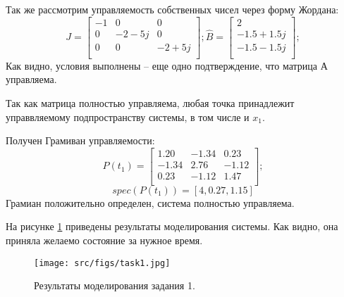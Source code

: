 Так же рассмотрим управляемость собственных чисел через форму Жордана:
\[
        J = \begin{bmatrix}
                -1 & 0 & 0 \\
                0 & -2 - 5j & 0 \\
                0 & 0 & -2 + 5j \\
                \end{bmatrix};
        \hat{B} = \begin{bmatrix}
                2 \\
                -1.5 + 1.5j \\
                -1.5 - 1.5j \\
                \end{bmatrix};
\]
Как видно, условия выполнены -- еще одно подтверждение, что матрица А управляема.

Так как матрица полностью управляема, любая точка принадлежит управвляемому подпространству системы, в том числе и \(x_1\).

Получен Грамиван управляемости:
\[
        P(t_1) = \begin{bmatrix}
        1.20 & -1.34 & 0.23 \\
        -1.34 & 2.76 & -1.12 \\
        0.23 & -1.12 & 1.47 \\
        \end{bmatrix};
\]
\[
        spec(P(t_1)) = [4, 0.27, 1.15]
\]Грамиан положительно определен, система полностью управляема.

На рисунке \ref{fig:task1} приведены результаты моделирования системы. Как видно, она приняла желаемо состояние за нужное время.
\begin{figure}[ht!]
        \centering
        \texttt{[image: src/figs/task1.jpg]}
        \caption{Результаты моделирования задания 1.}
        \label{fig:task1}
\end{figure}


